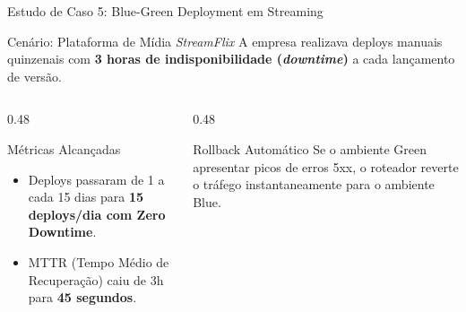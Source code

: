 \documentclass[aspectratio=169, 9pt]{beamer}
\begin{document}
\begin{frame}{Estudo de Caso 5: Blue-Green Deployment em Streaming}
  \begin{block}{Cenário: Plataforma de Mídia \textit{StreamFlix}}
    A empresa realizava deploys manuais quinzenais com \textbf{3 horas de indisponibilidade (\textit{downtime})} a cada lançamento de versão.
  \end{block}

  \vspace{0.1cm}

  \begin{center}
  \end{center}

  \vspace{-0.1cm}

  \begin{columns}[T]
    \begin{column}{0.48\textwidth}
      \begin{exampleblock}{Métricas Alcançadas}
        \begin{itemize}
          \item Deploys passaram de 1 a cada 15 dias para \textbf{15 deploys/dia com Zero Downtime}.
          \item MTTR (Tempo Médio de Recuperação) caiu de 3h para \textbf{45 segundos}.
        \end{itemize}
      \end{exampleblock}
    \end{column}

    \begin{column}{0.48\textwidth}
      \begin{alertblock}{Rollback Automático}
        Se o ambiente Green apresentar picos de erros 5xx, o roteador reverte o tráfego instantaneamente para o ambiente Blue.
      \end{alertblock}
    \end{column}
  \end{columns}
\end{frame}
\end{document}

